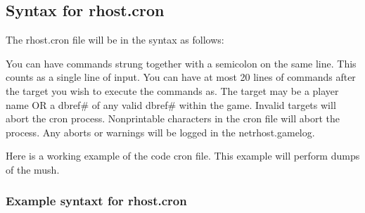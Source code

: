\documentclass[letterpaper,10pt,english]{sphinxmanual}
\begin{document}
\subsection{Syntax for rhost.cron}
\label{\detokenize{maintenance:syntax-for-rhost-cron}}
\sphinxAtStartPar
The rhost.cron file will be in the syntax as follows:

\begin{sphinxVerbatim}[commandchars=\\\{\}]
  
\end{sphinxVerbatim}

\sphinxAtStartPar
You can have commands strung together with a semicolon
on the same line.  This counts as a single line of input.
You can have at most 20 lines of commands after the target
you wish to execute the commands as.  The target may
be a player name OR a dbref\# of any valid dbref\# within
the game.  Invalid targets will abort the cron process.
Non\sphinxhyphen{}printable characters in the cron file will abort
the process.  Any aborts or warnings will be logged
in the netrhost.gamelog.

\sphinxAtStartPar
Here is a working example of the code cron file.
This example will perform dumps of the mush.


\subsubsection{Example syntaxt for rhost.cron}
\label{\detokenize{maintenance:example-syntaxt-for-rhost-cron}}
\begin{sphinxVerbatim}[commandchars=\\\{\}]
        
       
       
        
\end{sphinxVerbatim}
\end{document}
